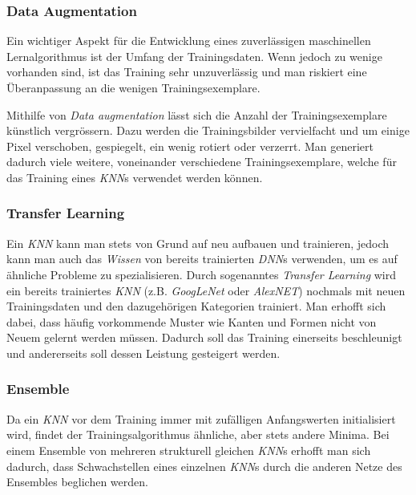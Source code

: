 \subsubsection{Data Augmentation}

Ein wichtiger Aspekt für die Entwicklung eines zuverlässigen maschinellen Lernalgorithmus ist der Umfang der Trainingsdaten. Wenn jedoch zu wenige vorhanden sind, ist das Training sehr unzuverlässig und man riskiert eine Überanpassung an die wenigen Trainingsexemplare.

Mithilfe von \textit{Data augmentation} lässt sich die Anzahl der Trainingsexemplare künstlich vergrössern. Dazu werden die Trainingsbilder vervielfacht und um einige Pixel verschoben, gespiegelt, ein wenig rotiert oder verzerrt. Man generiert dadurch viele weitere, voneinander verschiedene Trainingsexemplare, welche für das Training eines \textit{KNN}s verwendet werden können.

\subsubsection{Transfer Learning}\label{cha:theo:mod:tl}

Ein \textit{KNN} kann man stets von Grund auf neu aufbauen und trainieren, jedoch kann man auch das \textit{Wissen} von bereits trainierten \textit{DNN}s verwenden, um es auf ähnliche Probleme zu spezialisieren. Durch sogenanntes \textit{Transfer Learning} wird ein bereits trainiertes \textit{KNN} (z.B. \textit{GoogLeNet} oder \textit{AlexNET}) nochmals mit neuen Trainingsdaten und den dazugehörigen Kategorien trainiert. Man erhofft sich dabei, dass häufig vorkommende Muster wie Kanten und Formen nicht von Neuem gelernt werden müssen. Dadurch soll das Training einerseits beschleunigt und andererseits soll dessen Leistung gesteigert werden.

\subsubsection{Ensemble}

Da ein \textit{KNN} vor dem Training immer mit zufälligen Anfangswerten initialisiert wird, findet der Trainingsalgorithmus ähnliche, aber stets andere Minima. Bei einem Ensemble von mehreren strukturell gleichen \textit{KNN}s erhofft man sich dadurch, dass Schwachstellen eines einzelnen \textit{KNN}s durch die anderen Netze des Ensembles beglichen werden.




















